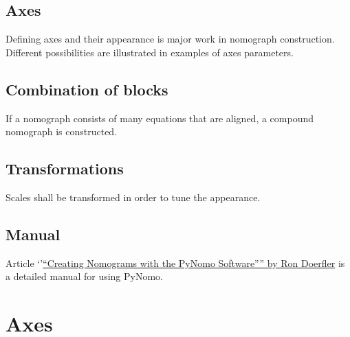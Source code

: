 \documentclass[a4paper,11pt,english]{sphinxmanual}
\begin{document}
\section{Axes}
\label{main_page:axes}
Defining axes and their appearance is major work in nomograph
construction. Different possibilities are illustrated in examples of
axes parameters.


\section{Combination of blocks}
\label{main_page:combination-of-blocks}
If a nomograph consists of many equations that are aligned, a compound
nomograph is constructed.


\section{Transformations}
\label{main_page:transformations}
Scales shall be transformed in order to tune the
appearance.


\section{Manual}
\label{main_page:manual}
Article `'\href{http://www.myreckonings.com/pynomo/CreatingNomogramsWithPynomo.pdf}{``Creating Nomograms with the PyNomo Software'''' by Ron
Doerfler} is a detailed
manual for using PyNomo.


\chapter{Axes}
\label{axes/axes:axes}\label{axes/axes::doc}
\end{document}
